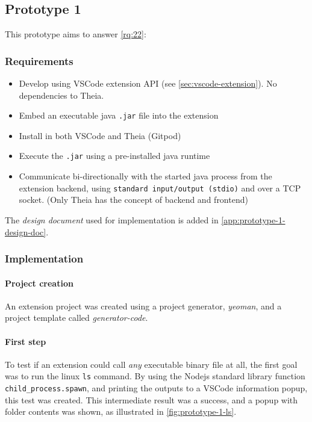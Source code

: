 \subsection{Prototype 1}

This prototype aims to answer \cref{rq:22}:
\begin{displayquote}
  
\end{displayquote}


\subsubsection{Requirements}

\begin{itemize}
  \item Develop using VSCode extension \acrshort{API} (see \cref{sec:vscode-extension}). No dependencies to Theia.
  \item Embed an executable java \texttt{.jar} file into the extension
  \item Install in both VSCode and Theia (Gitpod)
  \item Execute the \texttt{.jar} using a pre-installed java runtime
  \item Communicate bi-directionally with the started java process from the extension backend, using \texttt{standard input/output (stdio)} and over a TCP socket. (Only Theia has the concept of backend and frontend)
\end{itemize}

The \textit{design document} used for implementation is added in \cref{app:prototype-1-design-doc}.

\subsubsection{Implementation}

\paragraph*{Project creation}
An extension project was created using a project generator, \emph{yeoman}, and a project template called \emph{generator-code}.~\cite{microsoftYourFirstExtension2020}


\paragraph*{First step}
To test if an extension could call \emph{any} executable binary file at all, the first goal was to run the linux \texttt{ls} command.
By using the \gls{Nodejs} standard library function \texttt{child\_process.spawn}, and printing the outputs to a \gls{VSCode} information popup, this test was created.
This intermediate result was a success, and a popup with folder contents was shown, as illustrated in \cref{fig:prototype-1-ls}.

